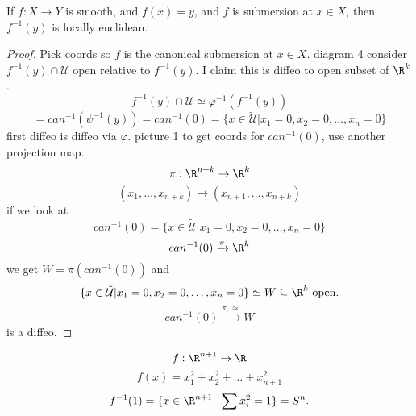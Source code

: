 \begin{proposition}
  If $f: X \to Y$ is smooth, and $f(x)=y$, and $f$ is submersion at $x\in X$, then $f ^{-1}(y)$ is locally euclidean.
\end{proposition}
\begin{proof}
  Pick coords so $f$ is the canonical submersion at $x\in X$.
  \newline diagram 4
  \newline consider $f ^{-1}(y)\cap \mathcal{U}$ open relative to $f ^{-1}(y)$. I claim this is diffeo to open subset of $\R^k$.
    $$f ^{-1}(y)\cap \mathcal{U}\simeq \varphi ^{-1}(f ^{-1}(y))$$
    $$=can ^{-1}(\psi ^{-1}(y))=can ^{-1}(0)=\{x\in \tilde{\mathcal{U}}|x_1=0,x_2=0,\dots,x_n=0\}$$
    first diffeo is diffeo via $\varphi$.
  \newline picture 1
  \newline to get coords for $can ^{-1}(0)$, use another projection map.
    $$\pi:\R^{n+k}\to \R^k$$
    $$(x_1,\dots,x_{n+k})\mapsto(x_{n+1},\dots,x_{n+k})$$
  if we look at
    $$can ^{-1}(0)=\{x\in \tilde{\mathcal{U}}|x_1=0,x_2=0,\dots,x_n=0\}$$
    $$can ^{-1}(0) \xrightarrow{\pi}\R^k$$
  we get $W=\pi(can ^{-1}(0))$ and
  $$\{x\in \tilde{\mathcal{U}}|x_1=0,x_2=0,\dots,x_n=0\}\simeq W \subseteq \R^k \text{ open}.$$
    $$can ^{-1}(0) \xrightarrow{\pi, \simeq}W$$
  is a diffeo.
\end{proof}
\begin{example}
  $$f:\R^{n+1}\to \R$$
  $$f(x)=x_1^2+x_2^2+\dots +x_{n+1}^2$$
  $$f ^{-1}(1)=\{x\in \R^{n+1} | \sum x_i^2=1\}=S^n.$$
\end{example}

